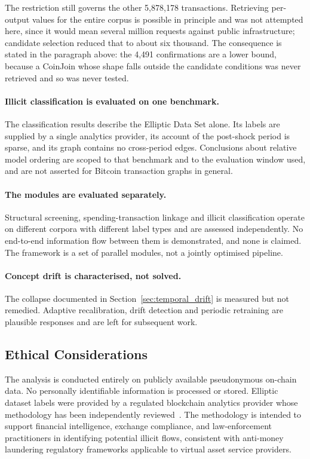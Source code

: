 \documentclass[12pt,a4paper]{article}
\begin{document}
The restriction still governs the other 5{,}878{,}178
transactions. Retrieving per-output values for the entire corpus
is possible in principle and was not attempted here, since it
would mean several million requests against public
infrastructure; candidate selection reduced that to about six
thousand. The consequence is stated in the paragraph above: the
4{,}491 confirmations are a lower bound, because a CoinJoin whose
shape falls outside the candidate conditions was never retrieved
and so was never tested.

\paragraph{Illicit classification is evaluated on one benchmark.}
The classification results describe the Elliptic Data Set alone.
Its labels are supplied by a single analytics provider, its
account of the post-shock period is sparse, and its graph
contains no cross-period edges. Conclusions about relative model
ordering are scoped to that benchmark and to the evaluation
window used, and are not asserted for Bitcoin transaction graphs
in general.

\paragraph{The modules are evaluated separately.}
Structural screening, spending-transaction linkage and illicit
classification operate on different corpora with different label
types and are assessed independently. No end-to-end information
flow between them is demonstrated, and none is claimed. The
framework is a set of parallel modules, not a jointly optimised
pipeline.

\paragraph{Concept drift is characterised, not solved.}
The collapse documented in Section~\ref{sec:temporal_drift} is
measured but not remedied. Adaptive recalibration, drift
detection and periodic retraining are plausible responses and are
left for subsequent work.


\subsection{Ethical Considerations}

The analysis is conducted entirely on publicly available
pseudonymous on-chain data. No personally identifiable
information is processed or stored. Elliptic dataset labels
were provided by a regulated blockchain analytics provider
whose methodology has been independently reviewed~\citep{weber2019}.
The methodology is intended to support financial intelligence,
exchange compliance, and law-enforcement practitioners in
identifying potential illicit flows, consistent with
anti-money laundering regulatory frameworks applicable to
virtual asset service providers.
\end{document}
